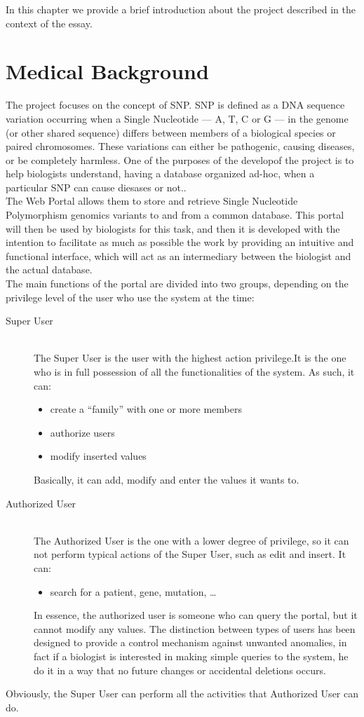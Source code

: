 In this chapter we provide a brief introduction about the project described in the context of the essay.
\section{Medical Background}
The project focuses on the concept of SNP. SNP is defined as a DNA sequence variation occurring when a Single Nucleotide — A, T, C or G — in the genome (or other shared sequence) differs between members of a biological species or paired chromosomes. These variations can either be pathogenic, causing diseases, or be completely harmless. One of the purposes of the developof the project is to help biologists understand, having  a database organized ad-hoc, when a particular SNP can cause diesases or not.. \\ 
The Web Portal allows them to store and retrieve Single Nucleotide
Polymorphism genomics variants to and from a common database. This portal will then be used by biologists for this task, and then it is developed with the intention to facilitate as much as possible the work by providing an intuitive and functional interface, which will act as an intermediary between the biologist and the actual database. \\
The main functions of the portal are divided into two groups, depending on the privilege level of the user who use the system at the time:
\begin{description}
  \item[Super User] \hfill \\
  The Super User is the user with the highest action privilege.It is the one who is in full possession of all the functionalities of the system. As such, it can:
		\begin{itemize}
  		\item create a “family” with one or more members
 		 \item authorize users
 		 \item modify inserted values
		\end{itemize}
Basically, it can add, modify and enter the values it wants to.
  \item[Authorized User] \hfill \\
The Authorized User is the one with a lower degree of privilege, so it can not perform typical actions of the Super User, such as edit and insert. It can:
		\begin{itemize}
  		\item search for a patient, gene, mutation, \ldots
		\end{itemize}
In essence, the authorized user is someone who can query the portal, but it cannot modify any values​​. The distinction between types of users has been designed to provide a control mechanism against unwanted anomalies, in fact if a biologist is interested in making simple queries to the system, he do it in a way that no future changes or accidental deletions occurs.
\end{description}
Obviously, the Super User can perform all the activities that Authorized User can do.

